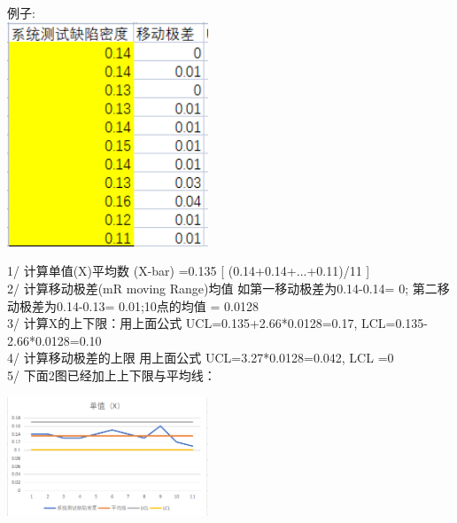 \begin{description}
\item[]
\end{description}

例子:\\

\includegraphics[width=6cm]{微信截图_20210929131748.png}

1/ 计算单值(X)平均数 (X-bar) =0.135 {[} (0.14+0.14+...+0.11)/11 {]}\\
2/ 计算移动极差(mR moving Range)均值 如第一移动极差为0.14-0.14= 0;
第二移动极差为0.14-0.13= 0.01;10点的均值 = 0.0128\\
3/ 计算X的上下限：用上面公式 UCL=0.135+2.66*0.0128=0.17,
LCL=0.135-2.66*0.0128=0.10\\
4/ 计算移动极差的上限 用上面公式 UCL=3.27*0.0128=0.042, LCL =0\\
5/ 下面2图已经加上上下限与平均线：


\includegraphics[width=6cm]{微信截图_20210927084548.png}


